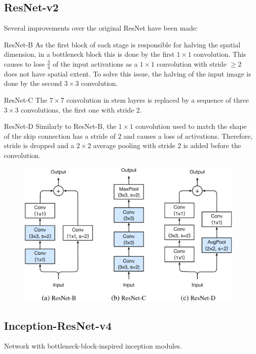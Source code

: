 \subsection{ResNet-v2}

Several improvements over the original ResNet have been made:
\begin{descriptionlist}
    \item[ResNet-B] 
        As the first block of each stage is responsible for halving the spatial dimension, in a bottleneck block this is done by the first $1 \times 1$ convolution. This causes to lose $\frac{3}{4}$ of the input activations as a $1 \times 1$ convolution with stride $\geq 2$ does not have spatial extent. To solve this issue, the halving of the input image is done by the second $3 \times 3$ convolution.

    \item[ResNet-C] 
        The $7 \times 7$ convolution in stem layers is replaced by a sequence of three $3 \times 3$ convolutions, the first one with stride $2$.

    \item[ResNet-D] 
        Similarly to ResNet-B, the $1 \times 1$ convolution used to match the shape of the skip connection has a stride of $2$ and causes a loss of activations. Therefore, stride is dropped and a $2 \times 2$ average pooling with stride $2$ is added before the convolution. 
\end{descriptionlist}

\begin{figure}[H]
    \centering
    \includegraphics[width=0.5\linewidth]{./img/resnet_v2.png}
\end{figure}


\subsection{Inception-ResNet-v4}

Network with bottleneck-block-inspired inception modules.

